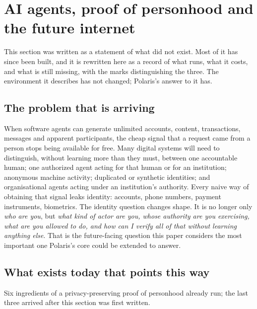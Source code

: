 \section{AI agents, proof of personhood and the future internet}
\label{sec:agents}

This section was written as a statement of what did not exist. Most of it has since been built, and
it is rewritten here as a record of what runs, what it costs, and what is still missing, with the
marks distinguishing the three. The environment it describes has not changed; Polaris's answer to it
has.

\subsection{The problem that is arriving}

When software agents can generate unlimited accounts, content, transactions, messages and apparent
participants, the cheap signal that a request came from a person stops being available for free.
Many digital systems will need to distinguish, without learning more than they must, between one
accountable human; one authorized agent acting for that human or for an institution; anonymous
machine activity; duplicated or synthetic identities; and organisational agents acting under an
institution's authority. Every naive way of obtaining that signal leaks identity: accounts, phone
numbers, payment instruments, biometrics. The identity question changes shape. It is no longer only
\emph{who are you}, but \emph{what kind of actor are you, whose authority are you exercising, what
are you allowed to do, and how can I verify all of that without learning anything else}. That is
the future-facing question this paper considers the most important one Polaris's core could be
extended to answer.

\subsection{What exists today that points this way}

Six ingredients of a privacy-preserving proof of personhood already run; the last three arrived
after this section was first written.

